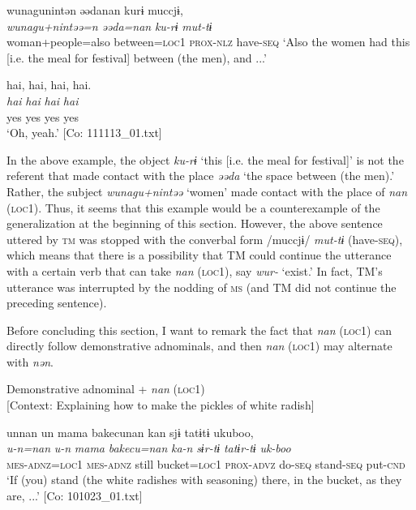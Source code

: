 {\TM}
\glll wunagunintən  əədanan  kurɨ  muccjɨ,\\
\textit{wunagu+nintəə=n}  \textit{əəda=nan}  \textit{ku-rɨ}  \textit{mut-tɨ}\\
    woman+people=also  between=\textsc{loc1}  \textsc{prox}-\textsc{nlz}  have-\textsc{seq}
\glt    ‘Also the women had this [i.e. the meal for festival] between (the men), and ...’

{\MS}
\glll   {\textbar}hai,  hai,  hai,  hai.{\textbar}\\
    \textit{hai}  \textit{hai}  \textit{hai}  \textit{hai}\\
    yes  yes  yes  yes\\
\glt    ‘Oh, yeah.’ [Co: 111113\_01.txt]
\z

In the above example, the object \textit{ku-rɨ} ‘this [i.e. the meal for festival]’ is not the referent that made contact with the place \textit{əəda} ‘the space between (the men).’ Rather, the subject \textit{wunagu+nintəə} ‘women’ made contact with the place of \textit{nan} (\textsc{loc1}). Thus, it seems that this example would be a counterexample of the generalization at the beginning of this section. However, the above sentence uttered by \textsc{tm} was stopped with the converbal form /muccjɨ/ \textit{mut-tɨ} (have-\textsc{seq}), which means that there is a possibility that TM could continue the utterance with a certain verb that can take \textit{nan} (\textsc{loc1}), say \textit{wur-} ‘exist.’ In fact, TM’s utterance was interrupted by the nodding of \textsc{ms} (and TM did not continue the preceding sentence).

Before concluding this section, I want to remark the fact that \textit{nan} (\textsc{loc1}) can directly follow demonstrative adnominals, and then \textit{nan} (\textsc{loc1}) may alternate with \textit{nən}.

\ea\label{ex:6-64}
\ea Demonstrative adnominal + \textit{nan} (\textsc{loc1})\\{}
[Context: Explaining how to make the pickles of white radish]

{\TM}
\glll unnan  un  mama  {\textbar}bakecu{\textbar}nan  kan   sjɨ  tatɨtɨ  ukuboo,\\
      \textit{u-n=nan}  \textit{u-n}  \textit{mama}  \textit{bakecu=nan}  \textit{ka-n} \textit{sɨr-tɨ}  \textit{tatɨr-tɨ}  \textit{uk-boo}\\
      \textsc{mes}-\textsc{adnz}=\textsc{loc1}  \textsc{mes}-\textsc{adnz}  still  bucket=\textsc{loc1}  \textsc{prox}-\textsc{advz}      do-\textsc{seq}  stand-\textsc{seq}  put-\textsc{cnd}\\
\glt ‘If (you) stand (the white radishes with seasoning) there, in the bucket, as they are, ...’ [Co: 101023\_01.txt]

